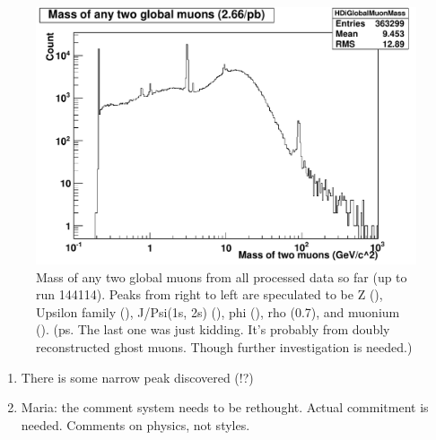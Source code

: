\begin{figure}
\includegraphics[width=120mm]{DailyLog/6264/6264DiGlobalMuonMass_DataAll.pdf}
\caption{Mass of any two global muons from all processed data so far (up to run 144114).  Peaks from right to left are speculated to be
Z (), Upsilon family (), J/Psi(1s, 2s) (), phi (), rho (0.7), and muonium ().
(ps. The last one was just kidding.  It's probably from doubly reconstructed ghost muons.  Though further investigation is needed.)}
\label{Figure_6264DiGlobalMuonMass_DataExceptLast}
\end{figure}



\begin{enumerate}
\item There is some narrow peak discovered (!?)
\item Maria: the comment system needs to be rethought.  Actual commitment is needed.
Comments on physics, not styles.
\end{enumerate}





